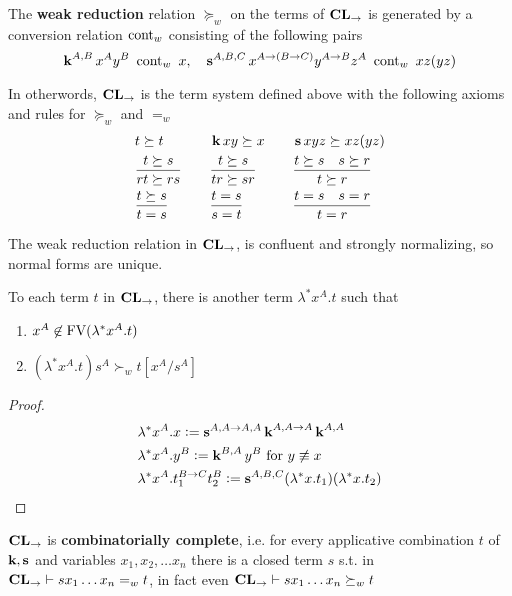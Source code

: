 \documentclass[11pt]{article}
\begin{document}
\begin{definition}[]
The \textbf{weak reduction} relation \(\succeq_w\) on the terms of \(\operatorname{\textbf{CL}}_\to\) is
generated by a conversion relation \(\text{cont}_w\) consisting of the following
pairs
\begin{equation*}
\operatorname{\textbf{k}}^{A,B}x^Ay^B\enspace\text{cont}_w\enspace x,\quad\operatorname{\textbf{s}}^{A,B,C}x^{A\to(B\to C)}y^{A\to B}z^A
\enspace\text{cont}_w\enspace xz(yz)
\end{equation*}

In otherwords, \(\operatorname{\textbf{CL}}_\to\) is the term system defined above with the following
axioms and rules for \(\succeq_w\) and \(=_w\)
\begin{alignat*}{3}
&t\succeq t&&\operatorname{\textbf{k}} xy\succeq x\quad&&\operatorname{\textbf{s}} xyz\succeq xz(yz)\\
&\frac{t\succeq s}{rt\succeq rs}\quad&&\frac{t\succeq s}{tr\succeq sr}&&
\frac{t\succeq s\quad s\succeq r}{t\succeq r}\\
&\frac{t\succeq s}{t=s}&&\frac{t=s}{s=t}&&\frac{t=s\quad s=r}{t=r}
\end{alignat*}
\end{definition}

\begin{theorem}[]
The weak reduction relation in \(\operatorname{\textbf{CL}}_\to\), is confluent and
strongly normalizing, so normal forms are unique.
\end{theorem}

\begin{theorem}[]
To each term \(t\) in \(\operatorname{\textbf{CL}}_\to\), there is another term \(\lambda^*x^A.t\) such
that
\begin{enumerate}
\item \(x^A\not\in\text{FV}(\lambda^*x^A.t)\)
\item \((\lambda^*x^A.t)s^A\succ_wt[x^A/s^A]\)
\end{enumerate}
\end{theorem}
\begin{proof}
\begin{align*}
&\lambda^*x^A.x:=\operatorname{\textbf{s}}^{A,A\to A,A}\operatorname{\textbf{k}}^{A,A\to A}\operatorname{\textbf{k}}^{A,A}\\
&\lambda^*x^A.y^B:=\operatorname{\textbf{k}}^{B,A}y^B\text{ for }y\not\equiv x\\
&\lambda^*x^A.t_1^{B\to C}t_2^B:=\operatorname{\textbf{s}}^{A,B,C}(\lambda^*x.t_1)(\lambda^*x.t_2)
\end{align*}
\end{proof}

\begin{corollary}[]
\(\operatorname{\textbf{CL}}_\to\) is \textbf{combinatorially complete}, i.e. for every applicative
combination \(t\) of \(\operatorname{\textbf{k}},\operatorname{\textbf{s}}\) and variables \(x_1,x_2,\dots x_n\) there is a
closed term \(s\) s.t. in \(\operatorname{\textbf{CL}}_\to\vdash sx_1\dots x_n=_w t\), in fact even
\(\operatorname{\textbf{CL}}_\to\vdash sx_1\dots x_n\succeq_w t\)
\end{corollary}
\end{document}
